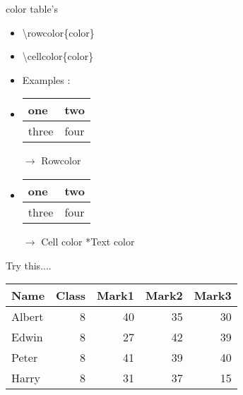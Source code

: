 \documentclass{beamer}
\begin{document}
\begin{frame}{color table's}
\begin{itemize}
\item \textbackslash rowcolor\{color\}
\item \textbackslash cellcolor\{color\}
\item[] Examples :
\item[] \begin{tabular}{|l|l|}
  \hline
\rowcolor{yellow} one & two \\ \hline
\rowcolor{red} three & four \\ \hline
\end{tabular} $\rightarrow$ Rowcolor
\item[] \begin{tabular}{|l|l|}
  \hline
\cellcolor{green} {one} & two \\ \hline
 three & \cellcolor{blue} \color{yellow} {four} \\ \hline
\end{tabular} $\rightarrow$ Cell color *Text color
\end{itemize}
\end{frame}

\begin{frame}{Try this....}
\begin{tabular}{|l|r|r|r|r|}
\hline
\rowcolor{green} Name & Class & Mark1 & Mark2 & Mark3\\\hline
Albert & 8 & 40 & 35 & 30 \\\hline
Edwin & 8 & \cellcolor{yellow} 27 & 42 & 39 \\\hline
Peter & 8 & 41 & 39 & 40 \\\hline
Harry & 8 & 31 & 37 & \cellcolor{red}15 \\\hline
\end{tabular}
\end{frame}
\end{document}
